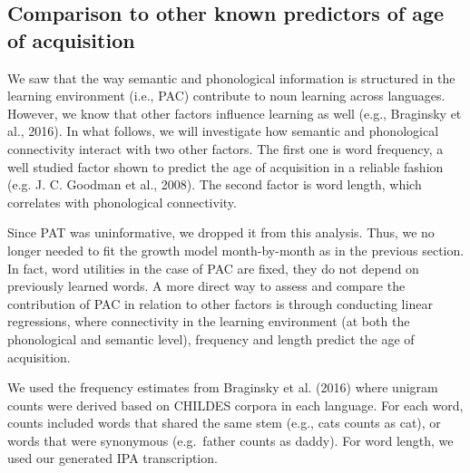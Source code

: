 \documentclass[10pt, letterpaper]{article}
\begin{document}
\subsection{Comparison to other known predictors of age of
acquisition}\label{comparison-to-other-known-predictors-of-age-of-acquisition}

We saw that the way semantic and phonological information is structured
in the learning environment (i.e., PAC) contribute to noun learning
across languages. However, we know that other factors influence learning
as well (e.g., Braginsky et al., 2016). In what follows, we will
investigate how semantic and phonological connectivity interact with two
other factors. The first one is word frequency, a well studied factor
shown to predict the age of acquisition in a reliable fashion (e.g. J.
C. Goodman et al., 2008). The second factor is word length, which
correlates with phonological connectivity.

Since PAT was uninformative, we dropped it from this analysis. Thus, we
no longer needed to fit the growth model month-by-month as in the
previous section. In fact, word utilities in the case of PAC are fixed,
they do not depend on previously learned words. A more direct way to
assess and compare the contribution of PAC in relation to other factors
is through conducting linear regressions, where connectivity in the
learning environment (at both the phonological and semantic level),
frequency and length predict the age of acquisition.

We used the frequency estimates from Braginsky et al. (2016) where
unigram counts were derived based on CHILDES corpora in each language.
For each word, counts included words that shared the same stem (e.g.,
cats counts as cat), or words that were synonymous (e.g.~father counts
as daddy). For word length, we used our generated IPA transcription.
\end{document}

